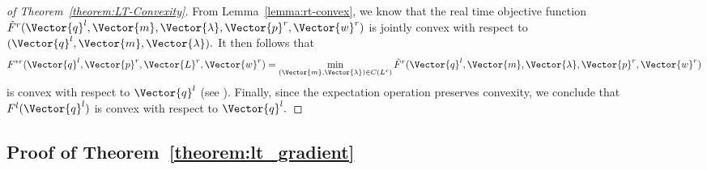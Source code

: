 \begin{proof}[of Theorem~\ref{theorem:LT-Convexity}]
  From Lemma~\ref{lemma:rt-convex}, we know that the real time
  objective function
  $\tilde{F}^r(\Vector{q}^l,\Vector{m},\Vector{\lambda},\Vector{p}^r,\Vector{w}^r)$
  is jointly convex with respect to
  $(\Vector{q}^l,\Vector{m},\Vector{\lambda}).$ It then follows
  that $$F^{*r}(\Vector{q}^l,\Vector{p}^r, \Vector{L}^r, \Vector{w}^r)
  = \min_{(\Vector{m},\Vector{\lambda}) \in C(L^r)}
  \tilde{F}^r(\Vector{q}^l,\Vector{m},\Vector{\lambda},\Vector{p}^r,\Vector{w}^r)$$
  is convex with respect to $\Vector{q}^l$ (see
  \cite{boyd2004convex}). Finally, since the expectation operation
  preserves convexity, we conclude that $F^l(\Vector{q}^l)$ is convex
  with respect to $\Vector{q}^l.$
\end{proof}


\subsection{Proof of Theorem~\ref{theorem:lt_gradient}}
\label{proof:lt_grad}

